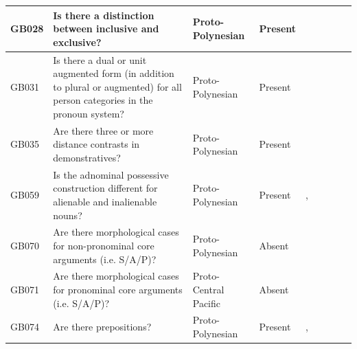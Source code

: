 \documentclass[a4paper,10pt]{article} %
\begin{document}
\begin{landscape}
\begin{longtable}{| p{2cm}| p{3cm}| p{2.5cm}|p{2cm}|p{2cm}|p{2cm}|p{2cm}|p{2cm}|p{2cm}|}
\hline
GB028&Is there a distinction between inclusive and exclusive?&Proto-Polynesian&Present&\citet[4]{marck2000_encyclo}& \cellcolor{hedvig_lightgreen!50}{True Positive} & \cellcolor{hedvig_lightgreen!50}{True Positive} & \cellcolor{hedvig_lightgreen!50}{True Positive} & \cellcolor{hedvig_lightgreen!50}{True Positive} \\ \hline
GB031&Is there a dual or unit augmented form (in addition to plural or augmented) for all person categories in the pronoun system?&Proto-Polynesian&Present&\citet[4]{marck2000_encyclo}& \cellcolor{hedvig_lightgreen!50}{True Positive} & \cellcolor{hedvig_lightgreen!50}{True Positive} & \cellcolor{hedvig_lightgreen!50}{True Positive} & \cellcolor{hedvig_lightgreen!50}{True Positive} \\ \hline
GB035&Are there three or more distance contrasts in demonstratives?&Proto-Polynesian&Present&\citet[77]{clark1976aspects}& \cellcolor{hedvig_lightgreen!50}{True Positive} & \cellcolor{hedvig_lightgreen!50}{True Positive} & \cellcolor{hedvig_lightgreen!50}{True Positive} & \cellcolor{hedvig_lightgreen!50}{True Positive} \\ \hline
GB059&Is the adnominal possessive construction different for alienable and inalienable nouns?&Proto-Polynesian&Present&\citet[4]{marck2000_encyclo}, \citet[47]{clark1976aspects}& \cellcolor{hedvig_lightgreen!50}{True Positive} & \cellcolor{hedvig_lightgreen!50}{True Positive} & \cellcolor{hedvig_lightgreen!50}{True Positive} & \cellcolor{hedvig_lightgreen!50}{True Positive} \\ \hline
GB070&Are there morphological cases for non-pronominal core arguments (i.e. S/A/P)?&Proto-Polynesian&Absent&\cite[261-261]{chung1978}& \cellcolor{hedvig_lightgreen!50}{True Negative} & \cellcolor{hedvig_yellow!50}{True Negative} & \cellcolor{hedvig_yellow!50}{True Negative} & \cellcolor{hedvig_yellow!50}{True Negative} \\ \hline
GB071&Are there morphological cases for pronominal core arguments (i.e. S/A/P)?&Proto-Central Pacific&Absent&\citet[1]{kikusawa2002proto}& \cellcolor{hedvig_lightgreen!50}{True Negative} & \cellcolor{hedvig_yellow!50}{True Negative} & \cellcolor{hedvig_yellow!50}{True Negative} & \cellcolor{hedvig_yellow!50}{True Negative} \\ \hline
GB074&Are there prepositions?&Proto-Polynesian&Present&\citet[26]{chung1978}, \citet[24, 43]{clark1976aspects}& \cellcolor{hedvig_lightgreen!50}{True Positive} & \cellcolor{hedvig_lightgreen!50}{True Positive} & \cellcolor{hedvig_lightgreen!50}{True Positive} & \cellcolor{hedvig_lightgreen!50}{True Positive} \\ \hline

\end{longtable}
\end{landscape}
\end{document}
